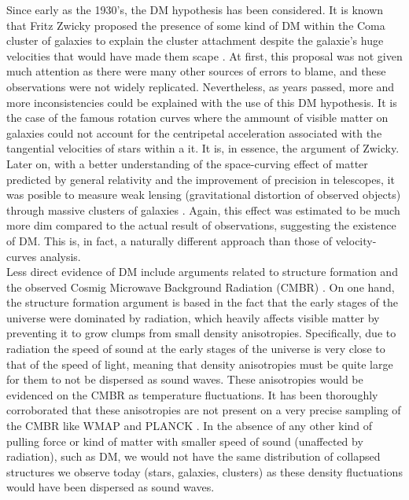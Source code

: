 Since early as the 1930's, the DM hypothesis has been considered. It is known that Fritz Zwicky proposed the presence of some kind of DM within the Coma cluster of galaxies to explain the cluster attachment despite the galaxie's huge velocities that would have made them scape \cite{Fritz}. At first, this proposal was not given much attention as there were many other sources of errors to blame, and these observations were not widely replicated. Nevertheless, as years passed, more and more inconsistencies could be explained with the use of this DM hypothesis. It is the case of the famous rotation curves \cite{rotationCurves} where the ammount of visible matter on galaxies could not account for the centripetal acceleration associated with the tangential velocities of stars within a it. It is, in essence, the argument of Zwicky. Later on, with a better understanding of the space-curving effect of matter predicted by general relativity and the improvement of precision in telescopes, it was posible to measure weak lensing (gravitational distortion of observed objects) through massive clusters of galaxies \cite{weak_Lensing}. Again, this effect was estimated to be much more dim compared to the actual result of observations, suggesting the existence of DM. This is, in fact, a naturally different approach than those of velocity-curves analysis.\\

Less direct evidence of DM include arguments related to structure formation and the observed Cosmig Microwave Background Radiation (CMBR) \cite{structure formation}. On one hand, the structure formation argument is based in the fact that the early stages of the universe were dominated by radiation, which heavily affects visible matter by preventing it to grow clumps from small density anisotropies. Specifically, due to radiation the speed of sound at the early stages of the universe is very close to that of the speed of light, meaning that density anisotropies must be quite large for them to not be dispersed as sound waves. These anisotropies would be evidenced on the CMBR as temperature fluctuations. It has been thoroughly corroborated that these anisotropies are not present on a very precise sampling of the CMBR like WMAP \cite{WMAP} and PLANCK \cite{PLANCK}. In the absence of any other kind of pulling force or kind of matter with smaller speed of sound (unaffected by radiation), such as DM, we would not have the same distribution of collapsed structures we observe today (stars, galaxies, clusters) as these density fluctuations would have been dispersed as sound waves. \\



